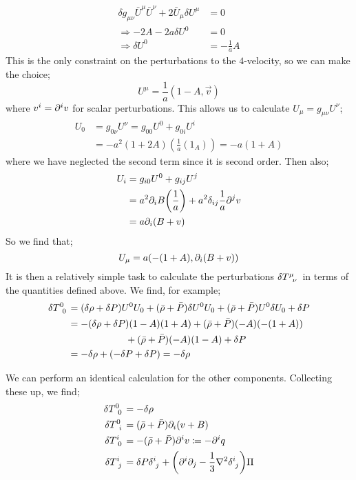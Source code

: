 \begin{align*}
\delta g_{\mu\nu}\bar{U}^\mu \bar{U}^\nu + 2\bar{U}_\mu \delta U^\mu &= 0 \\
\Rightarrow -2A - 2a \delta U^0 &= 0 \\
\Rightarrow \delta U^0 &= -\frac{1}{a}A
\end{align*}
This is the only constraint on the perturbations to the $4$-velocity, so we can make the choice;
\begin{equation}
U^\mu = \frac{1}{a}(1 - A, \vec{v})
\end{equation}
where $v^i = \partial^i v$ for scalar perturbations. This allows us to calculate $U_\mu = g_{\mu\nu}U^\nu$;
\begin{align*}
U_0 &= g_{0\nu}U^\nu = g_{00}U^0 + g_{0i}U^i \\
&= -a^2(1 + 2A)\left(\frac{1}{a}(1 _ A)\right) = -a(1 + A)
\end{align*}
where we have neglected the second term since it is second order. Then also;
\begin{align*}
U_{i} &= g_{i0}U^0 + g_{ij}U^j \\
&= a^2 \del_i B \left(\frac{1}{a}\right) + a^2 \delta_{ij}\frac{1}{a}\del^j v \\
&= a \del_i(B + v)
\end{align*}
So we find that;
\begin{equation}
U_{\mu} = a\left(-(1 + A), \del_i(B + v)\right)
\end{equation}
It is then a relatively simple task to calculate the perturbations $\delta T\indices{^{\mu}_{\nu}}$ in terms of the quantities defined above. We find, for example;
\begin{align*}
\delta T\indices{^{0}_{0}} &= (\delta \rho + \delta P)U^0 U_0 + (\bar{\rho} + \bar{P})\delta U^0 U_0 + (\bar{\rho} + \bar{P})U^0 \delta U_0 + \delta P \\
&= -(\delta \rho + \delta P)(1 - A)(1 + A) + (\bar{\rho} + \bar{P})(-A)\left(-(1 + A)\right) \\
&\qquad \qquad \qquad+ (\bar{\rho} + \bar{P})(-A)(1 - A) + \delta P \\
&= -\delta \rho + (-\delta P + \delta P) = -\delta \rho
\end{align*}
\begin{definitionbox}
We can perform an identical calculation for the other components. Collecting these up, we find;
\begin{align}
\delta T\indices{^{0}_{0}} &= -\delta \rho \\
\delta T\indices{^{0}_{i}} &= (\bar{\rho} + \bar{P})\del_i(v + B) \\
\delta T\indices{^{i}_{0}} &= -(\bar{\rho} + \bar{P})\del^i v \coloneqq - \del^i q \\
\delta T\indices{^{i}_{j}} &= \delta P \delta\indices{^{i}_{j}} + \left(\del^i \del_j - \frac{1}{3}\nabla^2 \delta\indices{^{i}_{j}}\right)\Pi
\end{align}
\end{definitionbox}
